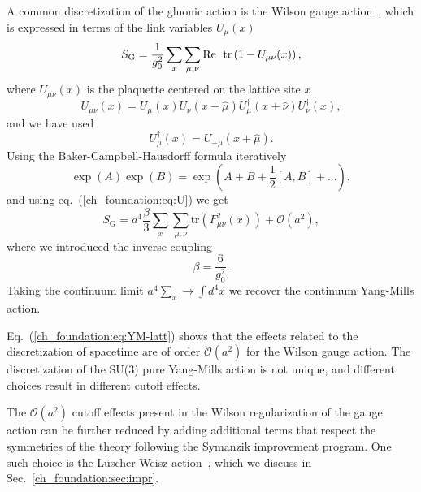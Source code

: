 A common discretization of the gluonic action is the Wilson gauge action~\citep{Wilson:1974sk}, which is expressed in terms of the link variables $U_{\mu}(x)$
\begin{equation}
S_{\textrm{G}}=\frac{1}{g_0^2}\sum_x\sum_{\mu,\nu}{\textrm{Re\; tr}}\left(1-U_{\mu\nu}(x)\right),
\end{equation} 
where $U_{\mu\nu}(x)$ is the plaquette centered on the lattice site $x$
\begin{equation}
\label{ch_foundation:eq:plaq}
U_{\mu\nu}(x)=U_{\mu}(x)U_{\nu}(x+\hat{\mu})U_{\mu}^{\dagger}(x+\hat{\nu})U_{\nu}^{\dagger}(x),
\end{equation}
and we have used 
\begin{equation}
U_{\mu}^{\dagger}(x)=U_{-\mu}(x+\hat{\mu}).
\end{equation}
Using the Baker-Campbell-Hausdorff formula iteratively
\begin{equation}
\exp\left(A\right)\exp\left(B\right)=\exp\left(A+B+\frac{1}{2}\left[A,B\right]+...\right),
\end{equation}
and using eq.~(\ref{ch_foundation:eq:U}) we get
\begin{equation}
\label{ch_foundation:eq:YM-latt}
S_{\textrm{G}}=a^4\frac{\beta}{3}\sum_x\sum_{\mu,\nu}{\textrm{tr}}\left(F_{\mu\nu}^2(x)\right)+\mathcal{O}(a^2),
\end{equation}
where we introduced the inverse coupling
\begin{equation}
\beta=\frac{6}{g_0^2}.
\end{equation}
Taking the continuum limit $a^4\sum_x\rightarrow\int d^4x$ we recover the continuum Yang-Mills action.

Eq.~(\ref{ch_foundation:eq:YM-latt}) shows that the effects related to the discretization of spacetime are of order $\mathcal{O}(a^2)$ for the Wilson gauge action. The discretization of the SU(3) pure Yang-Mills action is not unique, and different choices result in different cutoff effects.

The $\mathcal{O}(a^2)$ cutoff effects present in the Wilson regularization of the gauge action can be further reduced by adding additional terms that respect the symmetries of the theory following the Symanzik improvement program. One such choice is the Lüscher-Weisz action~\cite{}, which we discuss in Sec.~\ref{ch_foundation:sec:impr}.



